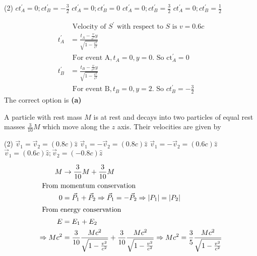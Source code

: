 \begin{enumerate}
\begin{minipage}{\textwidth}
\end{minipage}
\begin{tasks}(2)
	\task[\textbf{A.}] $c t_{A}^{\prime}=0 ; c t_{B}^{\prime}=-\frac{3}{2}$
	\task[\textbf{B.}]$c t_{A}^{\prime}=0 ; c t_{B}^{\prime}=0$
	\task[\textbf{C.}]$c t_{A}^{\prime}=0 ; c t_{B}^{\prime}=\frac{3}{2}$
	\task[\textbf{D.}] $c t_{A}^{\prime}=0 ; c t_{B}^{\prime}=\frac{1}{2}$
\end{tasks}
\begin{answer}
\begin{align*}
&\text { Velocity of } S^{\prime} \text { with respect to } S \text { is } v=0.6 c\\
t_{A}^{\prime}&=\frac{t_{A}-\frac{v}{c^{2}} y}{\sqrt{1-\frac{v^{2}}{c^{2}}}}\\
&\text { For event } \mathrm{A}, t_{A}=0, y=0 \text {. So } \mathrm{ct}_{A}^{\prime}=0\\
t_{B}^{\prime}&=\frac{t_{B}-\frac{v}{c^{2}} y}{\sqrt{1-\frac{v^{2}}{c^{2}}}}\\
&\text { For event } \mathrm{B}, t_{B}=0, y=2 \text {. So } c t_{B}^{\prime}=-\frac{3}{2}
\end{align*}
The correct option is \textbf{(a)}
\end{answer}
\begin{minipage}{\textwidth}
	\item A particle with rest mass $M$ is at rest and decays into two particles of equal rest masses $\frac{3}{10} M$ which move along the $z$ axis. Their velocities are given by
\end{minipage}
\begin{tasks}(2)
	\task[\textbf{A.}] $\vec{v}_{1}=\vec{v}_{2}=(0.8 c) \hat{z}$
	\task[\textbf{B.}]$\vec{v}_{1}=-\vec{v}_{2}=(0.8 c) \hat{z}$
	\task[\textbf{C.}]$\vec{v}_{1}=-\vec{v}_{2}=(0.6 c) \hat{z}$
	\task[\textbf{D.}]$\vec{v}_{1}=(0.6 c) \hat{z} ; \vec{v}_{2}=(-0.8 c) \hat{z}$
\end{tasks}
\begin{answer}
	\begin{align*}
	M &\rightarrow \frac{3}{10} M+\frac{3}{10} M\\
	\intertext { From momentum conservation }
	0&=\vec{P}_{1}+\vec{P}_{2} \Rightarrow \vec{P}_{1}=-\vec{P}_{2} \Rightarrow\left|P_{1}\right|=\left|P_{2}\right|\\
	\intertext { From energy conservation }
	E&=E_{1}+E_{2}\\
	\Rightarrow M c^{2}&=\frac{3}{10} \frac{M c^{2}}{\sqrt{1-\frac{v^{2}}{c^{2}}}}+\frac{3}{10} \frac{M c^{2}}{\sqrt{1-\frac{v^{2}}{c^{2}}}} \Rightarrow M c^{2}=\frac{3}{5} \frac{M c^{2}}{\sqrt{1-\frac{v^{2}}{c^{2}}}}\\

\end{align*}
\end{answer}
\end{enumerate}
